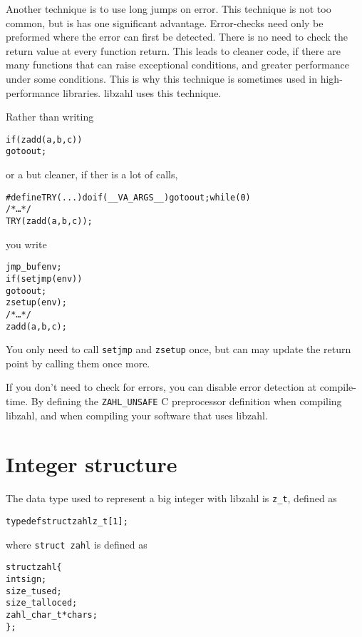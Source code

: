 Another technique is to use long jumps on error.
This technique is not too common, but is has one
significant advantage. Error-checks need only be
preformed where the error can first be detected.
There is no need to check the return value at every
function return. This leads to cleaner code, if
there are many functions that can raise exceptional
conditions, and greater performance under some
conditions. This is why this technique is sometimes
used in high-performance libraries. libzahl uses
this technique.

Rather than writing

\begin{alltt}
   if (zadd(a, b, c))
       goto out;
\end{alltt}

\noindent
or a but cleaner, if ther is a lot of calls,

\begin{alltt}
   #define TRY(...) do if (__VA_ARGS__) goto out; while (0)
   \textcolor{c}{/* \textrm{\ldots} */}
   TRY(zadd(a, b, c));
\end{alltt}

\noindent
you write

\begin{alltt}
   jmp_buf env;
   if (setjmp(env))
       goto out;
   zsetup(env);
   \textcolor{c}{/* \textrm{\ldots} */}
   zadd(a, b, c);
\end{alltt}

You only need to call {\tt setjmp} and {\tt zsetup}
once, but can may update the return point by calling
them once more.

If you don't need to check for errors, you can
disable error detection at compile-time. By defining
the {\tt ZAHL\_UNSAFE} C preprocessor definition
when compiling libzahl, and when compiling your
software that uses libzahl.


\newpage
\section{Integer structure}
\label{sec:Integer structure}

The data type used to represent a big integer with
libzahl is {\tt z\_t}, defined as

\begin{alltt}
   typedef struct zahl z_t[1];
\end{alltt}

\noindent
where {\tt struct zahl} is defined as

\begin{alltt}
   struct zahl \{
       int sign;
       size_t used;
       size_t alloced;
       zahl_char_t *chars;
   \};
\end{alltt}

